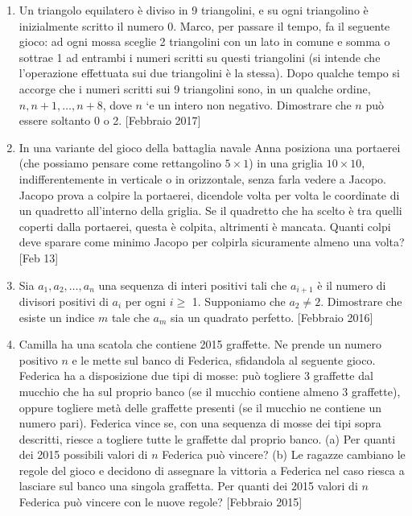 \documentclass[a4paper]{article}
\theoremstyle{remark}
\theoremstyle{definition}
\newcommand{\subscript}[2]{$#1  #2$}
\begin{document}
\begin{enumerate}[label=(\subscript{d}{\arabic*})]
	\item Un triangolo equilatero è diviso in 9 triangolini, e su ogni triangolino è inizialmente
	scritto il numero 0. Marco, per passare il tempo, fa il seguente gioco: ad ogni mossa sceglie 2
	triangolini con un lato in comune e somma o sottrae 1 ad entrambi i numeri scritti su questi
	triangolini (si intende che l’operazione effettuata sui due triangolini è la stessa). Dopo qualche
	tempo si accorge che i numeri scritti sui 9 triangolini sono, in un qualche ordine, $ n, n+1, \dots , n+8 $,
	dove $ n $ `e un intero non negativo. Dimostrare che $ n $ può essere soltanto 0 o 2. [Febbraio 2017]
	
	\item In una variante del gioco della battaglia navale Anna posiziona una portaerei (che possiamo
	pensare come rettangolino $ 5 \times 1 $) in una griglia $ 10 \times 10 $, indifferentemente in verticale o in
	orizzontale, senza farla vedere a Jacopo. Jacopo prova a colpire la portaerei, dicendole volta per
	volta le coordinate di un quadretto all’interno della griglia. Se il quadretto che ha scelto è tra
	quelli coperti dalla portaerei, questa è colpita, altrimenti è mancata. Quanti colpi deve sparare
	come minimo Jacopo per colpirla sicuramente almeno una volta? [Feb 13]
	
	\item Sia $ a_1, a_2, \dots , a_n $ una sequenza di interi positivi tali che $ a_{i+1} $ è il numero di divisori positivi
	di $ a_i $ per ogni $ i \geq $ 1. Supponiamo che $ a_2 \neq 2 $. Dimostrare che esiste un indice $ m $ tale che $ a_m $ sia
	un quadrato perfetto. [Febbraio 2016]
	
	\item Camilla ha una scatola che contiene 2015 graffette. Ne prende un numero positivo $ n $ e le mette
	sul banco di Federica, sfidandola al seguente gioco. Federica ha a disposizione due tipi di mosse:
	può togliere $ 3 $ graffette dal mucchio che ha sul proprio banco (se il mucchio contiene almeno
	3 graffette), oppure togliere metà delle graffette presenti (se il mucchio ne contiene un numero
	pari). Federica vince se, con una sequenza di mosse dei tipi sopra descritti, riesce a togliere tutte
	le graffette dal proprio banco.
	(a) Per quanti dei 2015 possibili valori di $ n $ Federica può vincere?
	(b) Le ragazze cambiano le regole del gioco e decidono di assegnare la vittoria a Federica nel
	caso riesca a lasciare sul banco una singola graffetta. Per quanti dei 2015 valori di $ n $
	Federica può vincere con le nuove regole? [Febbraio 2015]
	

\end{enumerate}
\end{document}
